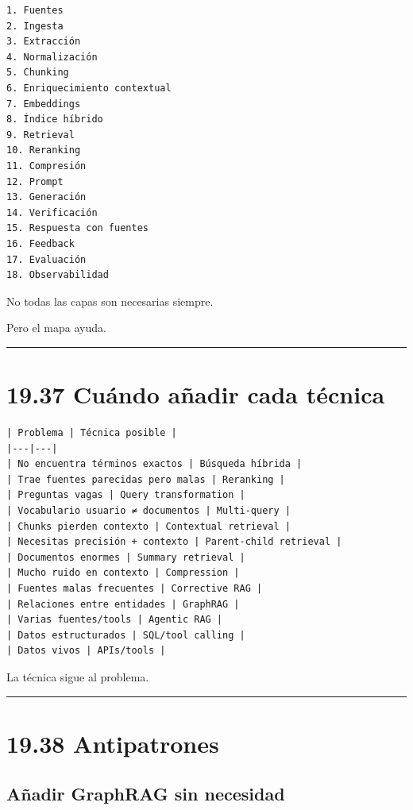 \begin{lstlisting}
1. Fuentes
2. Ingesta
3. Extracción
4. Normalización
5. Chunking
6. Enriquecimiento contextual
7. Embeddings
8. Índice híbrido
9. Retrieval
10. Reranking
11. Compresión
12. Prompt
13. Generación
14. Verificación
15. Respuesta con fuentes
16. Feedback
17. Evaluación
18. Observabilidad
\end{lstlisting}

No todas las capas son necesarias siempre.

Pero el mapa ayuda.

\begin{center}\rule{0.5\linewidth}{0.5pt}\end{center}

\section{19.37 Cuándo añadir cada
técnica}\label{cuuxe1ndo-auxf1adir-cada-tuxe9cnica}

\begin{lstlisting}
| Problema | Técnica posible |
|---|---|
| No encuentra términos exactos | Búsqueda híbrida |
| Trae fuentes parecidas pero malas | Reranking |
| Preguntas vagas | Query transformation |
| Vocabulario usuario ≠ documentos | Multi-query |
| Chunks pierden contexto | Contextual retrieval |
| Necesitas precisión + contexto | Parent-child retrieval |
| Documentos enormes | Summary retrieval |
| Mucho ruido en contexto | Compression |
| Fuentes malas frecuentes | Corrective RAG |
| Relaciones entre entidades | GraphRAG |
| Varias fuentes/tools | Agentic RAG |
| Datos estructurados | SQL/tool calling |
| Datos vivos | APIs/tools |
\end{lstlisting}

La técnica sigue al problema.

\begin{center}\rule{0.5\linewidth}{0.5pt}\end{center}

\section{19.38 Antipatrones}\label{antipatrones-8}

\subsection{Añadir GraphRAG sin
necesidad}\label{auxf1adir-graphrag-sin-necesidad}

